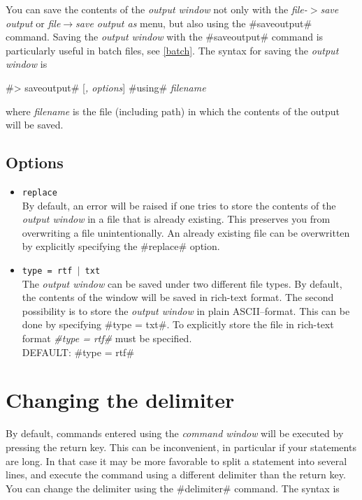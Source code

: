 You can save the contents of the {\em output window} not only with
the {\em file-$>$save output} or {\em file$\rightarrow$save output
as} menu, but also using the #saveoutput# command. Saving the {\em
output window} with the #saveoutput# command is  particularly
useful in batch files, see \autoref{batch}. The syntax for saving
the {\em output window} is

#> saveoutput# [{\em , options}] #using# {\em filename}

where {\em filename} is the file (including path) in which the
contents of the output will be saved.


\subsection*{Options}

\begin{itemize}
\item {\tt replace} \\
By default, an error will be raised if one tries to store the
contents of the {\em output window} in a file that is already
existing. This preserves you from overwriting a file
unintentionally. An already existing file can be overwritten by
explicitly specifying the #replace# option.
\item {\tt type = rtf $|$ txt } \\
The {\em output window} can be saved under two different file
types. By default, the contents of the window will be saved in
rich-text format. The second possibility is to store the {\em
output window} in plain ASCII--format. This can be done by
specifying #type = txt#. To explicitly store the file in rich-text
format {\em #type = rtf#} must be specified. \\
DEFAULT: #type = rtf#
\end{itemize}

\section{Changing the delimiter}
\label{delimiter} 

By default, commands entered using the {\em command window} will
be executed by pressing the return key. This can be inconvenient,
in particular if your statements are long. In that case it may be
more favorable to split a statement into several lines, and
execute the command using a different delimiter than the return
key. You can change the delimiter using the #delimiter# command. The syntax is

